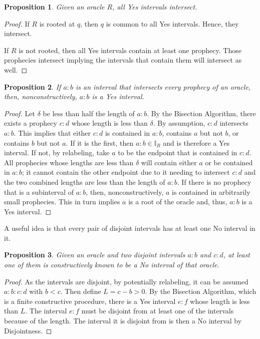 \documentclass[12pt]{article}
\newtheorem{proposition}{Proposition}[section]
\begin{document}
\begin{proposition}\label{os:yesinter}
    Given an oracle $R$, all Yes intervals intersect. 
\end{proposition}

\begin{proof}
    If $R$ is rooted at $q$, then $q$ is common to all Yes intervals. Hence, they intersect. 

    If $R$ is not rooted, then all Yes intervals contain at least one prophecy. Those prophecies intersect implying the intervals that contain them will intersect as well. 
\end{proof}


\begin{proposition}\label{os:inter}
    If $a:b$ is an interval that intersects every prophecy of an oracle, then, nonconstructively, $a:b$ is a Yes interval. 
\end{proposition}

\begin{proof}
    Let $\delta$ be less than half the length of $a:b$. By the Bisection Algorithm, there exists a prophecy $c:d$ whose length is less than $\delta$. By assumption, $c:d$ intersects $a:b$. This implies that either $c:d$ is contained in $a:b$, contains $a$ but not $b$, or contains $b$ but not $a$. If it is the first, then $a:b \in \mathbb{I}_R$ and is therefore a Yes interval. If not, by relabeling, take $a$ to be the endpoint that is contained in $c:d$. All prophecies whose lengths are less than $\delta$ will contain either $a$ or be contained in $a:b$; it cannot contain the other endpoint due to it needing to intersect $c:d$ and the two combined lengths are less than the length of $a:b$. If there is no prophecy that is a subinterval of $a:b$, then, nonconstructively, $a$ is contained in arbitrarily small prophecies. This in turn implies $a$ is a root of the oracle and, thus, $a:b$ is a Yes interval. 
\end{proof}

A useful idea is that every pair of disjoint intervals has at least one No interval in it. 

\begin{proposition}
    Given an oracle and two disjoint intervals $a:b$ and $c:d$, at least one of them is constructively known to be a No interval of that oracle. 
\end{proposition}

\begin{proof}
    As the intervals are disjoint, by potentially relabeling, it can be assumed $a:b:c:d$ with $b < c$. Then define $L = c-b > 0$. By the Bisection Algorithm, which is a finite constructive procedure, there is a Yes interval $e:f$ whose length is less than $L$. The interval $e:f$ must be disjoint from at least one of the intervals because of the length. The interval it is disjoint from is then a No interval by Disjointness. 
\end{proof}
\end{document}
